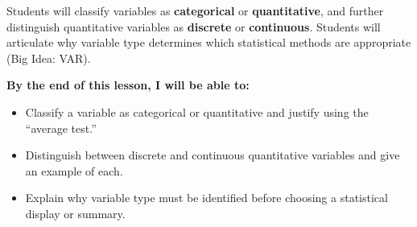 \documentclass[aspectratio=169, 11pt]{beamer}
\begin{document}
{
\begin{frame}[t, plain]
  \vspace{0.45cm}\par
  \hspace{0.55cm}%
  \begin{minipage}{0.9\textwidth}


    \normalsize
    Students will classify variables as \textbf{categorical} or
    \textbf{quantitative}, and further distinguish quantitative variables as
    \textbf{discrete} or \textbf{continuous}. Students will articulate why
    variable type determines which statistical methods are appropriate
    (Big Idea: VAR).

    \vspace{0.55cm}

    \normalsize\textbf{\color{navy}By the end of this lesson, I will be able to:}

    \smallskip
    \begin{itemize}
      \setlength{\itemsep}{0.3em}\setlength{\topsep}{0.2em}
      \item Classify a variable as categorical or quantitative and justify
            using the ``average test.''
      \item Distinguish between discrete and continuous quantitative variables
            and give an example of each.
      \item Explain why variable type must be identified before choosing a
            statistical display or summary.
    \end{itemize}

  \end{minipage}
\end{frame}
}
\end{document}
